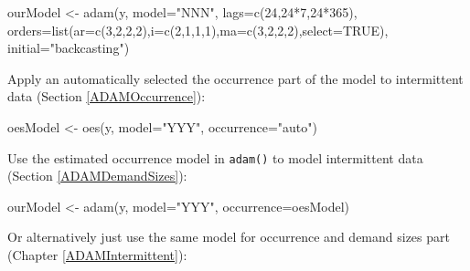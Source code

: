 \documentclass[
]{book}
\newenvironment{Shaded}{\begin{snugshade}}{\end{snugshade}}
\newcommand{\AttributeTok}[1]{\textcolor[rgb]{0.77,0.63,0.00}{#1}}
\newcommand{\ConstantTok}[1]{\textcolor[rgb]{0.00,0.00,0.00}{#1}}
\newcommand{\DecValTok}[1]{\textcolor[rgb]{0.00,0.00,0.81}{#1}}
\newcommand{\FunctionTok}[1]{\textcolor[rgb]{0.00,0.00,0.00}{#1}}
\newcommand{\NormalTok}[1]{#1}
\newcommand{\OtherTok}[1]{\textcolor[rgb]{0.56,0.35,0.01}{#1}}
\newcommand{\SpecialCharTok}[1]{\textcolor[rgb]{0.00,0.00,0.00}{#1}}
\newcommand{\StringTok}[1]{\textcolor[rgb]{0.31,0.60,0.02}{#1}}
\theoremstyle{definition}
\theoremstyle{definition}
\theoremstyle{definition}
\theoremstyle{definition}
\theoremstyle{remark}
\begin{document}
\begin{Shaded}
\begin{Highlighting}[]
\NormalTok{ourModel }\OtherTok{\textless{}{-}} \FunctionTok{adam}\NormalTok{(y, }\AttributeTok{model=}\StringTok{"NNN"}\NormalTok{, }\AttributeTok{lags=}\FunctionTok{c}\NormalTok{(}\DecValTok{24}\NormalTok{,}\DecValTok{24}\SpecialCharTok{*}\DecValTok{7}\NormalTok{,}\DecValTok{24}\SpecialCharTok{*}\DecValTok{365}\NormalTok{),}
                 \AttributeTok{orders=}\FunctionTok{list}\NormalTok{(}\AttributeTok{ar=}\FunctionTok{c}\NormalTok{(}\DecValTok{3}\NormalTok{,}\DecValTok{2}\NormalTok{,}\DecValTok{2}\NormalTok{,}\DecValTok{2}\NormalTok{),}\AttributeTok{i=}\FunctionTok{c}\NormalTok{(}\DecValTok{2}\NormalTok{,}\DecValTok{1}\NormalTok{,}\DecValTok{1}\NormalTok{,}\DecValTok{1}\NormalTok{),}\AttributeTok{ma=}\FunctionTok{c}\NormalTok{(}\DecValTok{3}\NormalTok{,}\DecValTok{2}\NormalTok{,}\DecValTok{2}\NormalTok{,}\DecValTok{2}\NormalTok{),}\AttributeTok{select=}\ConstantTok{TRUE}\NormalTok{),}
                 \AttributeTok{initial=}\StringTok{"backcasting"}\NormalTok{)}
\end{Highlighting}
\end{Shaded}

Apply an automatically selected the occurrence part of the model to intermittent data (Section \ref{ADAMOccurrence}):

\begin{Shaded}
\begin{Highlighting}[]
\NormalTok{oesModel }\OtherTok{\textless{}{-}} \FunctionTok{oes}\NormalTok{(y, }\AttributeTok{model=}\StringTok{"YYY"}\NormalTok{, }\AttributeTok{occurrence=}\StringTok{"auto"}\NormalTok{)}
\end{Highlighting}
\end{Shaded}

Use the estimated occurrence model in \texttt{adam()} to model intermittent data (Section \ref{ADAMDemandSizes}):

\begin{Shaded}
\begin{Highlighting}[]
\NormalTok{ourModel }\OtherTok{\textless{}{-}} \FunctionTok{adam}\NormalTok{(y, }\AttributeTok{model=}\StringTok{"YYY"}\NormalTok{, }\AttributeTok{occurrence=}\NormalTok{oesModel)}
\end{Highlighting}
\end{Shaded}

Or alternatively just use the same model for occurrence and demand sizes part (Chapter \ref{ADAMIntermittent}):
\end{document}
